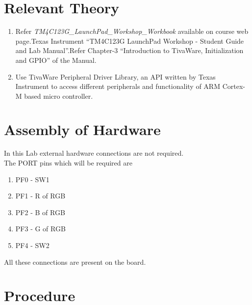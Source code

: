 \documentclass[a4paper,12pt,oneside]{book}
\begin{document}
\section {Relevant Theory}
\begin{enumerate}
\item Refer \textit {TM4C123G\_LaunchPad\_Workshop\_Workbook} available on course web page.Texas Instrument “TM4C123G
LaunchPad Workshop - Student Guide and Lab Manual”.Refer Chapter-3
“Introduction to TivaWare, Initialization and GPIO” of the Manual.
\item Use TivaWare Peripheral Driver Library, an API written by Texas Instrument to
access different peripherals and functionality of ARM Cortex-M based micro controller. 
\end{enumerate}

\section{Assembly of Hardware}
In this Lab external hardware connections are not required.\\
The PORT pins which will be required are 
\begin{enumerate}
\item PF0 - SW1
\item PF1 - R of RGB
\item PF2 - B of RGB
\item PF3 - G of RGB
\item PF4 - SW2
\end{enumerate}
All these connections are present on the board.
\section {Procedure}

\end{document}
